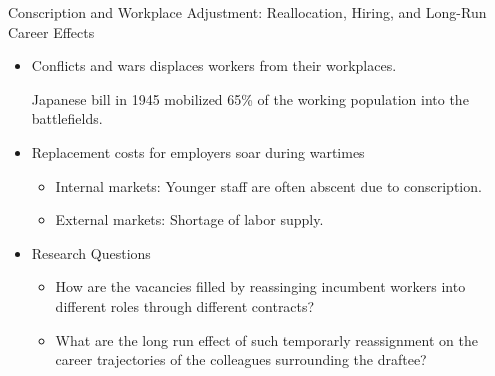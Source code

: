 \begin{frame}{Conscription and Workplace Adjustment: Reallocation, Hiring, and Long-Run Career Effects}
    \begin{itemize}[<+->]
        \item Conflicts and wars displaces workers from their workplaces.
        
        Japanese bill in 1945 mobilized 65\% of the working population into the battlefields.

        \vspace{0.5em}
        \item Replacement costs for employers soar during wartimes

        \begin{itemize}
            \item Internal markets: Younger staff are often abscent due to conscription.
            \item External markets: Shortage of labor supply.
        \end{itemize}

        \vspace{0.5em}

        \item[]
        {
        \begin{block}{Research Questions}
            \begin{itemize}
                \item How are the vacancies filled by reassinging incumbent workers into different roles through different contracts?
                \item What are the long run effect of such temporarly reassignment on the career trajectories of the colleagues surrounding the draftee?
            \end{itemize}
        \end{block}
        }

    \end{itemize}
\end{frame}
